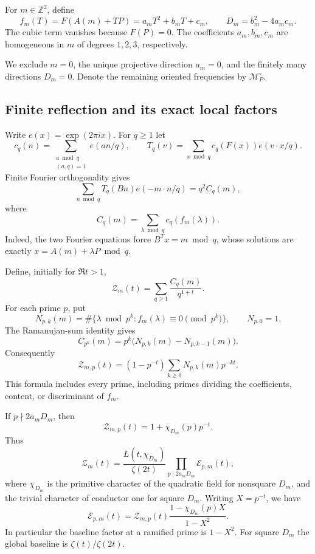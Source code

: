 \documentclass[11pt]{article}
\begin{document}
For $m\in\mathbb Z^2$, define
\[
f_m(T)=F(A(m)+TP)=a_mT^2+b_mT+c_m,
\qquad D_m=b_m^2-4a_mc_m.
\]
The cubic term vanishes because $F(P)=0$.
The coefficients $a_m,b_m,c_m$ are homogeneous
in $m$ of degrees $1,2,3$, respectively.

We exclude $m=0$, the unique projective direction
$a_m=0$, and the finitely many directions $D_m=0$.
Denote the remaining oriented frequencies by
$\mathcal M_P^\circ$.

\subsection{Finite reflection and its exact local factors}

Write $e(x)=\exp(2\pi i x)$. For $q\ge1$ let
\[
c_q(n)=\sum_{\substack{a\bmod q\\(a,q)=1}}
e(an/q),
\qquad
T_q(v)=\sum_{x\bmod q}c_q(F(x))e(v\cdot x/q).
\]
Finite Fourier orthogonality gives
\begin{equation}\label{eq:app-reflection}
\sum_{n\bmod q}T_q(Bn)e(-m\cdot n/q)
=q^2C_q(m),
\end{equation}
where
\[
C_q(m)=\sum_{\lambda\bmod q}c_q(f_m(\lambda)).
\]
Indeed, the two Fourier equations force
$B^Tx=m\bmod q$, whose solutions are exactly
$x=A(m)+\lambda P\bmod q$.

Define, initially for $\Re t>1$,
\[
\mathcal Z_m(t)=
\sum_{q\ge1}\frac{C_q(m)}{q^{1+t}}.
\]
For each prime $p$, put
\[
N_{p,k}(m)=
\#\{\lambda\bmod p^k:
f_m(\lambda)\equiv0\pmod{p^k}\},
\qquad N_{p,0}=1.
\]
The Ramanujan-sum identity gives
\[
C_{p^k}(m)=
p^k\bigl(N_{p,k}(m)-N_{p,k-1}(m)\bigr).
\]
Consequently
\begin{equation}\label{eq:app-local}
\boxed{
\mathcal Z_{m,p}(t)=
(1-p^{-t})\sum_{k\ge0}N_{p,k}(m)p^{-kt}.
}
\end{equation}
This formula includes every prime, including primes
dividing the coefficients, content, or discriminant
of $f_m$.

If $p\nmid2a_mD_m$, then
\[
\mathcal Z_{m,p}(t)
=1+\chi_{D_m}(p)p^{-t}.
\]
Thus
\begin{equation}\label{eq:app-quadratic}
\mathcal Z_m(t)
=
\frac{L(t,\chi_{D_m})}{\zeta(2t)}
\prod_{p\mid2a_mD_m}\mathcal E_{p,m}(t),
\end{equation}
where $\chi_{D_m}$ is the primitive character of the quadratic
field for nonsquare $D_m$, and the trivial character of conductor
one for square $D_m$. Writing $X=p^{-t}$, we have
\[
\mathcal E_{p,m}(t)=
\mathcal Z_{m,p}(t)\frac{1-\chi_{D_m}(p)X}{1-X^2}.
\]
In particular the baseline factor at a ramified prime is $1-X^2$.
For square $D_m$ the global baseline is $\zeta(t)/\zeta(2t)$.
\end{document}
